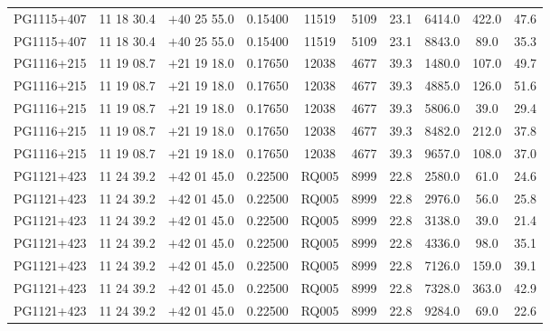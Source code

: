 \begin{landscape}
\begin{center}
\begin{longtable}{l c c c c c c c c c}
PG1115+407  &              11 18 30.4  &         $+$40 25 55.0  &       0.15400  & 11519  &   5109  &       23.1  &      6414.0  &  422.0  &  47.6  \\
PG1115+407  &              11 18 30.4  &         $+$40 25 55.0  &       0.15400  & 11519  &   5109  &       23.1  &      8843.0  &  89.0  &   35.3  \\
PG1116+215  &              11 19 08.7  &         $+$21 19 18.0  &       0.17650  & 12038  &   4677  &       39.3  &      1480.0  &  107.0  &  49.7  \\
PG1116+215  &              11 19 08.7  &         $+$21 19 18.0  &       0.17650  & 12038  &   4677  &       39.3  &      4885.0  &  126.0  &  51.6  \\
PG1116+215  &              11 19 08.7  &         $+$21 19 18.0  &       0.17650  & 12038  &   4677  &       39.3  &      5806.0  &  39.0  &   29.4  \\
PG1116+215  &              11 19 08.7  &         $+$21 19 18.0  &       0.17650  & 12038  &   4677  &       39.3  &      8482.0  &  212.0  &  37.8  \\
PG1116+215  &              11 19 08.7  &         $+$21 19 18.0  &       0.17650  & 12038  &   4677  &       39.3  &      9657.0  &  108.0  &  37.0  \\
PG1121+423  &              11 24 39.2  &         $+$42 01 45.0  &       0.22500  & RQ005  &   8999  &       22.8  &      2580.0  &  61.0  &   24.6  \\
PG1121+423  &              11 24 39.2  &         $+$42 01 45.0  &       0.22500  & RQ005  &   8999  &       22.8  &      2976.0  &  56.0  &   25.8  \\
PG1121+423  &              11 24 39.2  &         $+$42 01 45.0  &       0.22500  & RQ005  &   8999  &       22.8  &      3138.0  &  39.0  &   21.4  \\
PG1121+423  &              11 24 39.2  &         $+$42 01 45.0  &       0.22500  & RQ005  &   8999  &       22.8  &      4336.0  &  98.0  &   35.1  \\
PG1121+423  &              11 24 39.2  &         $+$42 01 45.0  &       0.22500  & RQ005  &   8999  &       22.8  &      7126.0  &  159.0  &  39.1  \\
PG1121+423  &              11 24 39.2  &         $+$42 01 45.0  &       0.22500  & RQ005  &   8999  &       22.8  &      7328.0  &  363.0  &  42.9  \\
PG1121+423  &              11 24 39.2  &         $+$42 01 45.0  &       0.22500  & RQ005  &   8999  &       22.8  &      9284.0  &  69.0  &   22.6  \\

\end{longtable}
\end{center}
\end{landscape}
